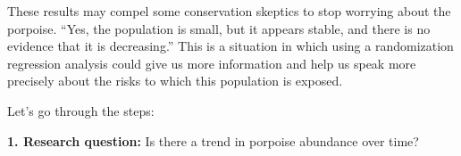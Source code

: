 \documentclass[
]{book}
\newenvironment{Shaded}{\begin{snugshade}}{\end{snugshade}}
\newcommand{\AttributeTok}[1]{\textcolor[rgb]{0.77,0.63,0.00}{#1}}
\newcommand{\DecValTok}[1]{\textcolor[rgb]{0.00,0.00,0.81}{#1}}
\newcommand{\ErrorTok}[1]{\textcolor[rgb]{0.64,0.00,0.00}{\textbf{#1}}}
\newcommand{\FloatTok}[1]{\textcolor[rgb]{0.00,0.00,0.81}{#1}}
\newcommand{\FunctionTok}[1]{\textcolor[rgb]{0.00,0.00,0.00}{#1}}
\newcommand{\NormalTok}[1]{#1}
\newcommand{\SpecialCharTok}[1]{\textcolor[rgb]{0.00,0.00,0.00}{#1}}
\begin{document}
\begin{Shaded}
\end{Shaded}

These results may compel some conservation skeptics to stop worrying about the porpoise. ``Yes, the population is small, but it appears stable, and there is no evidence that it is decreasing.'' This is a situation in which using a randomization regression analysis could give us more information and help us speak more precisely about the risks to which this population is exposed.

Let's go through the steps:

\textbf{1. Research question:} Is there a trend in porpoise abundance over time?
\end{document}
